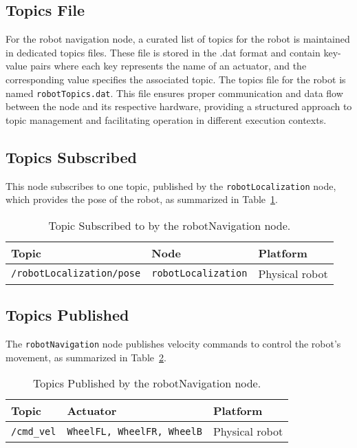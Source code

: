 \documentclass{CSSRforAfrica}
\begin{document}
\subsection*{Topics File}
For the robot navigation node, a curated list of topics for the robot is maintained in dedicated topics files. These file is stored in the .dat format and contain key-value pairs where each key represents the name of an actuator, and the corresponding value specifies the associated topic. The topics file for the robot is named \verb|robotTopics.dat|. This file ensures proper communication and data flow between the node and its respective hardware, providing a structured approach to topic management and facilitating operation in different execution contexts.

\subsection*{Topics Subscribed}
This node subscribes to one topic, published by the \verb|robotLocalization| node, which provides the
pose of the robot, as summarized in Table~\ref{tab:topics subscribed}.

\begin{table}[H]
\centering
\caption{Topic Subscribed to by the robotNavigation node.}
\label{tab:topics subscribed}
\begin{tabularx}{\textwidth}{|l|l|X|}
\hline
\textbf{Topic} & \textbf{Node} & \textbf{Platform} \\ \hline
\verb|/robotLocalization/pose| & \verb|robotLocalization| & Physical robot \\ \hline
\end{tabularx}
\end{table}


\subsection*{Topics Published}
The \verb|robotNavigation| node publishes velocity commands to control the robot's movement, as summarized in Table~\ref{tab:topics published}.

\begin{table}[H]
\centering
\caption{Topics Published by the robotNavigation node.}
\label{tab:topics published}
\begin{tabularx}{\textwidth}{|l|l|X|}
\hline
\textbf{Topic} & \textbf{Actuator} & \textbf{Platform} \\ \hline
\texttt{/cmd\_vel} & \verb|WheelFL, WheelFR, WheelB| & Physical robot \\ \hline
\end{tabularx}
\end{table}
\end{document}
